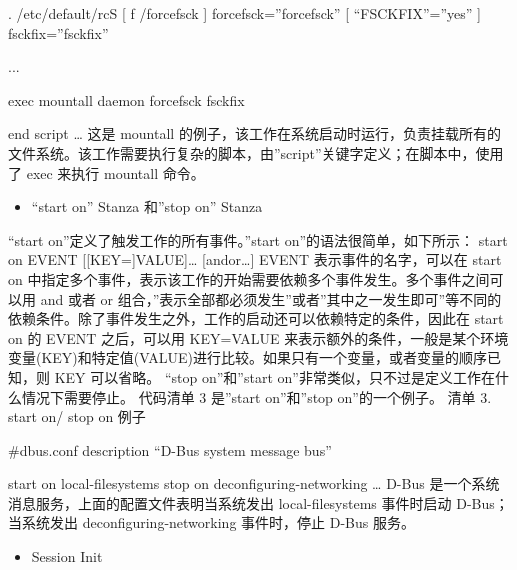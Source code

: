 \documentclass[a4paper,10pt,english]{sphinxmanual}
\begin{document}
\begin{sphinxVerbatim}[commandchars=\\\{\}]
. /etc/default/rcS
[ \PYGZhy{}f /forcefsck ] \PYGZam{}\PYGZam{} force\PYGZus{}fsck=”\PYGZhy{}\PYGZhy{}force\PYGZhy{}fsck”
[ “\PYGZdl{}FSCKFIX”=”yes” ] \PYGZam{}\PYGZam{} fsck\PYGZus{}fix=”\PYGZhy{}\PYGZhy{}fsck\PYGZhy{}fix”

...

exec mountall \textendash{}daemon \PYGZdl{}force\PYGZus{}fsck \PYGZdl{}fsck\PYGZus{}fix
\end{sphinxVerbatim}

end script
…
这是 mountall 的例子，该工作在系统启动时运行，负责挂载所有的文件系统。该工作需要执行复杂的脚本，由”script”关键字定义；在脚本中，使用了 exec 来执行 mountall 命令。
\begin{itemize}
\item {} 
“start on” Stanza 和”stop on” Stanza

\end{itemize}

“start on”定义了触发工作的所有事件。”start on”的语法很简单，如下所示：
start on EVENT {[}{[}KEY={]}VALUE{]}… {[}and\textbar{}or…{]}
EVENT 表示事件的名字，可以在 start on 中指定多个事件，表示该工作的开始需要依赖多个事件发生。多个事件之间可以用 and 或者 or 组合，”表示全部都必须发生”或者”其中之一发生即可”等不同的依赖条件。除了事件发生之外，工作的启动还可以依赖特定的条件，因此在 start on 的 EVENT 之后，可以用 KEY=VALUE 来表示额外的条件，一般是某个环境变量(KEY)和特定值(VALUE)进行比较。如果只有一个变量，或者变量的顺序已知，则 KEY 可以省略。
“stop on”和”start on”非常类似，只不过是定义工作在什么情况下需要停止。
代码清单 3 是”start on”和”stop on”的一个例子。
清单 3. start on/ stop on 例子

\#dbus.conf
description     “D-Bus system message bus”

start on local-filesystems
stop on deconfiguring-networking
…
D-Bus 是一个系统消息服务，上面的配置文件表明当系统发出 local-filesystems 事件时启动 D-Bus；当系统发出 deconfiguring-networking 事件时，停止 D-Bus 服务。
\begin{itemize}
\item {} 
Session Init

\end{itemize}
\end{document}
